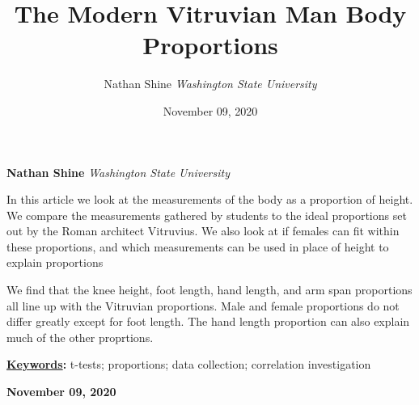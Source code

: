 \documentclass[]{article}
\title{\textbf{\textcolor{WSU.crimson}{The Modern Vitruvian
Man}} \newline \textbf{\textcolor{WSU.gray}{Body Proportions}}  }
\author{\Large Nathan
Shine\vspace{0.05in} \newline\normalsize\emph{Washington State
University}  }
\date{November 09, 2020}
\newcommand*{\authorfont}{\fontfamily{phv}\selectfont}
\renewenvironment{abstract}
 {{%
    \setlength{\leftmargin}{0mm}
    \setlength{\rightmargin}{\leftmargin}%
  }%
  \relax}
 {\endlist}
\begin{document}
	
%    


{%
\setlength{\parindent}{0pt}
\thispagestyle{plain}
{\fontsize{18}{20}\selectfont\raggedright 
\maketitle  %

}

{
   \vskip 13.5pt\relax \normalsize\fontsize{11}{12} 
   
\textbf{\authorfont Nathan Shine} \hskip 15pt \emph{\small Washington
State University}   

}

}








\begin{abstract}

    \hbox{\vrule height .2pt width 39.14pc}

    \vskip 8.5pt %

\noindent In this article we look at the measurements of the body as a
proportion of height. We compare the measurements gathered by students
to the ideal proportions set out by the Roman architect Vitruvius. We
also look at if females can fit within these proportions, and which
measurements can be used in place of height to explain
proportions\vspace{0.25in}

\noindent We find that the knee height, foot length, hand length, and
arm span proportions all line up with the Vitruvian proportions. Male
and female proportions do not differ greatly except for foot length. The
hand length proportion can also explain much of the other
proprtions.\vspace{0.25in}


\vskip 8.5pt \noindent \textbf{\underline{Keywords}:} t-tests;
proportions; data collection; correlation investigation \par

    




    
    \hbox{\vrule height .2pt width 39.14pc}
    \vskip 5pt 
    \hfill \textbf{\textcolor{WSU.gray}{ November 09, 2020 } }
    \vskip 5pt 
    
\end{abstract}
\end{document}
